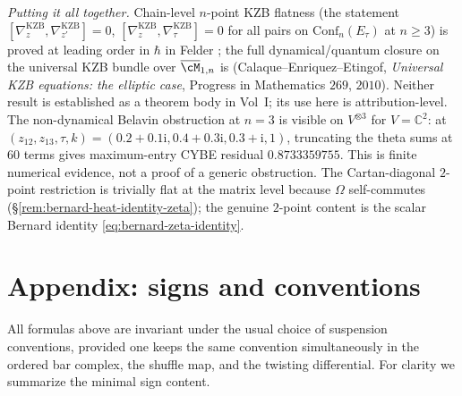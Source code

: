 \begin{remark}
\medskip
\noindent\emph{Putting it all together.} Chain-level $n$-point KZB
flatness (the statement
$[\nabla^{\mathrm{KZB}}_z, \nabla^{\mathrm{KZB}}_{z'}] = 0$,
$[\nabla^{\mathrm{KZB}}_z, \nabla^{\mathrm{KZB}}_\tau] = 0$ for all
pairs on $\mathrm{Conf}_n(E_\tau)$ at $n \geq 3$) is proved at
leading order in $\hbar$ in Felder \cite{Felder94}; the full
dynamical/quantum closure on the universal KZB bundle over
$\overline{\cM}_{1,n}$ is \cite[Thm.~$1$ + Thm.~$5$]{CEE09}
\textup{(}Calaque--Enriquez--Etingof,
\emph{Universal KZB equations: the elliptic case},
Progress in Mathematics $269$, $2010$\textup{)}. Neither result
is established as a theorem body in Vol~I; its use here is
attribution-level. The
non-dynamical Belavin obstruction at $n=3$ is visible on
$V^{\otimes3}$ for $V=\mathbb C^2$: at
$(z_{12},z_{13},\tau,k)=(0.2+0.1\mathrm i,0.4+0.3\mathrm i,
0.3+\mathrm i,1)$, truncating the theta sums at $60$ terms gives
maximum-entry CYBE residual $0.8733359755$.  This is finite numerical
evidence, not a proof of a generic obstruction. The Cartan-diagonal
$2$-point restriction is
trivially flat at the matrix level because $\Omega$ self-commutes
(\S\ref{rem:bernard-heat-identity-zeta}); the genuine $2$-point
content is the scalar Bernard identity
\eqref{eq:bernard-zeta-identity}.
\end{remark}


\section{Appendix: signs and conventions}

All formulas above are invariant under the usual choice of suspension conventions, provided one keeps
the same convention simultaneously in the ordered bar complex, the shuffle map, and the twisting
differential. For clarity we summarize the minimal sign content.

